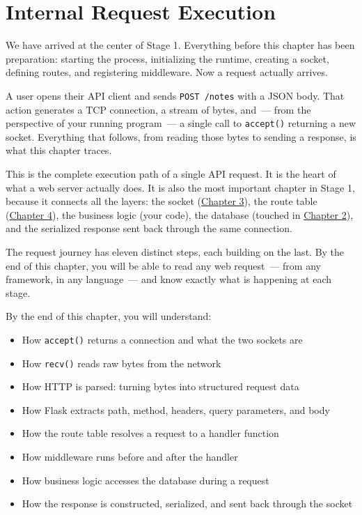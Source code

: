 \setcounter{chapter}{4}
\chapter{Internal Request Execution}\label{ch:05-internal-request-execution}


\chapterrule

We have arrived at the center of Stage 1. Everything before this chapter has been preparation: starting the process, initializing the runtime, creating a socket, defining routes, and registering middleware. Now a request actually arrives.

A user opens their API client and sends \texttt{POST\ /notes} with a JSON body. That action generates a TCP connection, a stream of bytes, and~--- from the perspective of your running program~--- a single call to \texttt{accept()} returning a new socket. Everything that follows, from reading those bytes to sending a response, is what this chapter traces.

This is the complete execution path of a single API request. It is the heart of what a web server actually does. It is also the most important chapter in Stage 1, because it connects all the layers: the socket (\hyperref[ch:03-network-capability]{Chapter 3}), the route table (\hyperref[ch:04-request-handling-paths]{Chapter 4}), the business logic (your code), the database (touched in \hyperref[ch:02-runtime-initialization]{Chapter 2}), and the serialized response sent back through the same connection.

The request journey has eleven distinct steps, each building on the last. By the end of this chapter, you will be able to read any web request~--- from any framework, in any language~--- and know exactly what is happening at each stage.

\begin{objectives}

By the end of this chapter, you will understand:

\begin{itemize}
\tightlist
\item
  How \texttt{accept()} returns a connection and what the two sockets are
\item
  How \texttt{recv()} reads raw bytes from the network
\item
  How HTTP is parsed: turning bytes into structured request data
\item
  How Flask extracts path, method, headers, query parameters, and body
\item
  How the route table resolves a request to a handler function
\item
  How middleware runs before and after the handler
\item
  How business logic accesses the database during a request
\item
  How the response is constructed, serialized, and sent back through the socket
\end{itemize}

\end{objectives}

